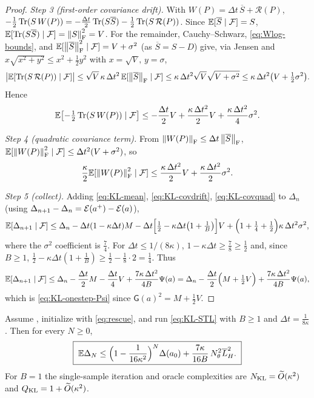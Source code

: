 \begin{proof}
\emph{Step 3 (first-order covariance drift).} With $W(P)=\Delta t\,\overline S+\mathcal R(P)$,
$-\tfrac12\operatorname{Tr}(S\,W(P))=-\tfrac{\Delta t}2\operatorname{Tr}(S\overline S)-\tfrac12\operatorname{Tr}(S\,\mathcal R(P))$. Since
$\mathbb{E}[\overline S\mid\mathcal{F}]=S$, $\mathbb{E}[\operatorname{Tr}(S\overline S)\mid\mathcal{F}]=\left\lVert S\right\rVert_{\mathrm{F}}^2=V$. For the remainder,
Cauchy--Schwarz, \eqref{eq:Wlog-bounds}, and $\mathbb{E}[\left\lVert \overline S\right\rVert_{\mathrm{F}}^2\mid\mathcal{F}]=V+\sigma^2$
(as $\overline S=S-D$) give, via Jensen and $x\sqrt{x^2+y^2}\leq x^2+\tfrac12y^2$ with $x=\sqrt V,\,y=\sigma$,
\[
    \bigl|\mathbb{E}[\operatorname{Tr}(S\,\mathcal R(P))\mid\mathcal{F}]\bigr|
    \leq\sqrt V\,\kappa\,\Delta t^2\,\mathbb{E}[\left\lVert \overline S\right\rVert_{\mathrm{F}}\mid\mathcal{F}]
    \leq\kappa\,\Delta t^2\sqrt V\sqrt{V+\sigma^2}\leq\kappa\,\Delta t^2\bigl(V+\tfrac12\sigma^2\bigr).
\]
Hence
\begin{equation}
\label{eq:KL-covdrift}
    \mathbb{E}\bigl[-\tfrac12\operatorname{Tr}(S\,W(P))\mid\mathcal{F}\bigr]
    \leq-\frac{\Delta t}2V+\frac{\kappa\,\Delta t^2}2V+\frac{\kappa\,\Delta t^2}4\sigma^2 .
\end{equation}

\emph{Step 4 (quadratic covariance term).} From $\left\lVert W(P)\right\rVert_{\mathrm{F}}\leq\Delta t\left\lVert \overline S\right\rVert_{\mathrm{F}}$,
$\mathbb{E}[\left\lVert W(P)\right\rVert_{\mathrm{F}}^2\mid\mathcal{F}]\leq\Delta t^2(V+\sigma^2)$, so
\begin{equation}
\label{eq:KL-covquad}
    \frac\kappa2\mathbb{E}[\left\lVert W(P)\right\rVert_{\mathrm{F}}^2\mid\mathcal{F}]\leq\frac{\kappa\,\Delta t^2}2V+\frac{\kappa\,\Delta t^2}2\sigma^2 .
\end{equation}

\emph{Step 5 (collect).} Adding \eqref{eq:KL-mean}, \eqref{eq:KL-covdrift}, \eqref{eq:KL-covquad} to
$\Delta_n$ (using $\Delta_{n+1}-\Delta_n=\mathcal{E}(a^+)-\mathcal{E}(a)$),
\[
    \mathbb{E}[\Delta_{n+1}\mid\mathcal{F}]
    \leq\Delta_n-\Delta t(1-\kappa\Delta t)M
    -\Delta t\Bigl[\tfrac12-\kappa\Delta t\bigl(1+\tfrac1B\bigr)\Bigr]V
    +\Bigl(1+\tfrac14+\tfrac12\Bigr)\kappa\,\Delta t^2\sigma^2 ,
\]
where the $\sigma^2$ coefficient is $\tfrac74$. For $\Delta t\leq1/(8\kappa)$, $1-\kappa\Delta t\geq\tfrac78\geq\tfrac12$
and, since $B\geq1$, $\tfrac12-\kappa\Delta t(1+\tfrac1B)\geq\tfrac12-\tfrac18\cdot2=\tfrac14$. Thus
\[
    \mathbb{E}[\Delta_{n+1}\mid\mathcal{F}]\leq\Delta_n-\frac{\Delta t}2M-\frac{\Delta t}4V+\frac{7\kappa\,\Delta t^2}{4B}\Psi(a)
    =\Delta_n-\frac{\Delta t}2\Bigl(M+\tfrac12V\Bigr)+\frac{7\kappa\,\Delta t^2}{4B}\Psi(a),
\]
which is \eqref{eq:KL-onestep-Psi} since $\mathsf G(a)^2=M+\tfrac12V$.
\end{proof}

\begin{theorem}
\label{thm:KL-Hlip}
Assume , initialize with \eqref{eq:rescue},
and run \eqref{eq:KL-STL} with $B\geq1$ and $\Delta t=\tfrac1{8\kappa}$. Then for every $N\geq0$,
\begin{equation}
\label{eq:KL-Hlip}
    \boxed{\;
    \mathbb{E}\Delta_N\leq\Bigl(1-\frac1{16\kappa^2}\Bigr)^N\Delta(a_0)+\frac{7\kappa}{16B}\,N_\theta^2\overline{L}_H^2 .
    \;}
\end{equation}
For $B=1$ the single-sample iteration and oracle complexities are $N_{\mathrm{KL}}=\widetilde O(\kappa^2)$ and
$Q_{\mathrm{KL}}=1+\widetilde O(\kappa^2)$.
\end{theorem}

